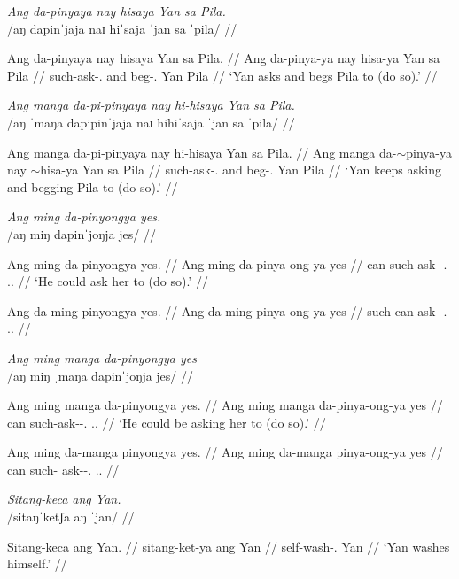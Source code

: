 \documentclass[12pt,a4paper]{scrartcl}
\newcommand{\TsgM}{{\Tsg}.{\M}}
\newcommand{\TsgF}{{\Tsg}.{\F}}
\newcommand{\til}{$\sim$} %
\begin{document}
\ex\begingl
\glpreamble \textit{Ang da-pinyaya nay hisaya Yan sa Pila.} \\
	/aŋ dapinˈjaja naɪ hiˈsaja ˈjan sa ˈpila/ //

	\gla Ang da-pinyaya nay hisaya Yan sa Pila. //
	\glb Ang da-pinya-ya nay hisa-ya Yan sa Pila //
	\glc \AgtT{} such-ask-\TsgM{} and beg-\TsgM{} Yan \Parg{} Pila //
	\glft `Yan asks and begs Pila to (do so).' //
\endgl\xe

\ex\begingl
\glpreamble \textit{Ang manga da-pi-pinyaya nay hi-hisaya Yan sa Pila.} \\
	/aŋ ˈmaŋa dapipinˈjaja naɪ hihiˈsaja ˈjan sa ˈpila/ //

	\gla Ang manga da-pi-pinyaya nay hi-hisaya Yan sa Pila. //
	\glb Ang manga da-\Iter{}\til{}pinya-ya nay \Iter{}\til{}hisa-ya Yan sa Pila //
	\glc \AgtT{} \Prog{} such-ask-\TsgM{} and beg-\TsgM{} Yan \Parg{} Pila //
	\glft `Yan keeps asking and begging Pila to (do so).' //
\endgl\xe

\pex
\a\begingl
\glpreamble \textit{Ang ming da-pinyongya yes.} \\
	/aŋ miŋ dapinˈjoŋja jes/ //

	\gla Ang ming da-pinyongya yes. //
	\glb Ang ming da-pinya-ong-ya yes //
	\glc \AgtT{} can such-ask-\Irr{}-\TsgM{} \TsgF{}.\Parg{} //
	\glft `He could ask her to (do so).' //
\endgl

\a\ljudge*\begingl
	\gla Ang da-ming pinyongya yes. //
	\glb Ang da-ming pinya-ong-ya yes //
	\glc \AgtT{} such-can ask-\Irr{}-\TsgM{} \TsgF{}.\Parg{} //
\endgl
\xe

\pex
\a\begingl
\glpreamble \textit{Ang ming manga da-pinyongya yes} \\
	/aŋ miŋ ˌmaŋa dapinˈjoŋja jes/ //

	\gla Ang ming manga da-pinyongya yes. //
	\glb Ang ming manga da-pinya-ong-ya yes //
	\glc \AgtT{} can \Prog{} such-ask-\Irr{}-\TsgM{} \TsgF{}.\Parg{} //
	\glft `He could be asking her to (do so).' //
\endgl

\a\ljudge*\begingl
	\gla Ang ming da-manga pinyongya yes. //
	\glb Ang ming da-manga pinya-ong-ya yes //
	\glc \AgtT{} can such-\Prog{} ask-\Irr{}-\TsgM{} \TsgF{}.\Parg{} //
\endgl
\xe

\ex\begingl
\glpreamble \textit{Sitang-keca ang Yan.}\\
	/sitaŋˈketʃa aŋ ˈjan/ //

\gla Sitang-keca ang Yan. //
\glb sitang-ket-ya ang Yan //
\glc self-wash-\TsgM{} \Aarg{} Yan //
\glft `Yan washes himself.' //
\endgl\xe
\end{document}
